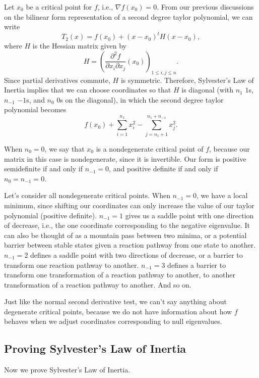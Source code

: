 Let $x_0$ be a critical point for $f$, i.e., $\nabla f(x_0) = 0$. From our previous discussions on the bilinear form representation of a second degree taylor polynomial, we can write
\[T_2(x) = f(x_0) + (x-x_0)^t H (x-x_0),\]
where $H$ is the \ac{Hessian matrix} given by
\[H = \left(\frac{\partial^2 f}{\partial x_i\partial x_j}(x_0)\right)_{1\leq i,j\leq n}.\]
Since partial derivatives commute, $H$ is symmetric. Therefore, Sylvester's Law of Inertia implies that we can choose coordinates so that $H$ is diagonal (with $n_1$ $1$s, $n_{-1}$ $-1$s, and $n_0$ $0$s on the diagonal), in which the second degree taylor polynomial becomes
\[f(x_0) + \sum_{i=1}^{n_1}x_i^2 - \sum_{j=n_1+1}^{n_1+n_{-1}}x_j^2.\]

When $n_0 = 0$, we say that $x_0$ is a nondegenerate critical point of $f$, because our matrix in this case is nondegenerate, since it is invertible. Our form is positive semidefinite if and only if $n_{-1} = 0$, and positive definite if and only if $n_0 = n_{-1} = 0$. 

Let's consider all nondegenerate critical points. When $n_{-1} = 0$, we have a local minimum, since shifting our coordinates can only increase the value of our taylor polynomial (positive definite). $n_{-1}=1$ gives us a saddle point with one direction of decrease, i.e., the one coordinate corresponding to the negative eigenvalue. It can also be thought of as a mountain pass between two minima, or a potential barrier between stable states given a reaction pathway from one state to another. $n_{-1}=2$ defines a saddle point with two directions of decrease, or a barrier to transform one reaction pathway to another. $n_{-1}=3$ defines a barrier to transform one transformation of a reaction pathway to another, to another transformation of a reaction pathway to another. And so on.

Just like the normal second derivative test, we can't say anything about degenerate critical points, because we do not have information about how $f$ behaves when we adjust coordinates corresponding to null eigenvalues. 

\subsection{Proving Sylvester's Law of Inertia}

Now we prove Sylvester's Law of Inertia.

